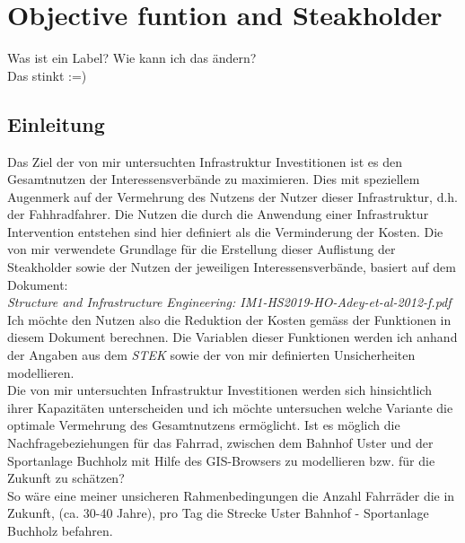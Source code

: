 %
%
%
%

\chapter{Objective funtion and Steakholder}
\label{chap:Function}

Was ist ein Label? \newline
Wie kann ich das ändern? \\ [2ex]
Das stinkt :=)

\section{\textbf{{Einleitung}}}

Das Ziel der von mir untersuchten Infrastruktur Investitionen ist es den Gesamtnutzen der Interessensverbände zu maximieren. \newline Dies mit speziellem Augenmerk auf der Vermehrung des Nutzens der Nutzer dieser Infrastruktur, d.h. der Fahhradfahrer. \newline
Die Nutzen die durch die Anwendung einer Infrastruktur Intervention entstehen sind hier definiert als die Verminderung der Kosten. \newline
Die von mir verwendete Grundlage für die Erstellung dieser Auflistung der Steakholder sowie der Nutzen der jeweiligen Interessensverbände, basiert auf dem Dokument: \\ [2ex]
\noindent\hspace*{10mm}\textit{Structure and Infrastructure Engineering: IM1-HS2019-HO-Adey-et-al-2012-f.pdf} \\ [2ex]
Ich möchte den Nutzen also die Reduktion der Kosten gemäss der Funktionen in diesem Dokument berechnen. 
Die Variablen dieser Funktionen werden ich anhand der Angaben aus dem \textit{STEK} sowie der von mir definierten Unsicherheiten modellieren. \\ [2ex]
Die von mir untersuchten Infrastruktur Investitionen werden sich hinsichtlich ihrer Kapazitäten unterscheiden und ich möchte untersuchen welche Variante die optimale Vermehrung des Gesamtnutzens ermöglicht. \newline
Ist es möglich die Nachfragebeziehungen für das Fahrrad, zwischen dem Bahnhof Uster und der Sportanlage Buchholz mit Hilfe des GIS-Browsers zu modellieren bzw. für die Zukunft zu schätzen? \\ [2ex]
So wäre eine meiner unsicheren Rahmenbedingungen die Anzahl Fahrräder die in Zukunft, \newline (ca. 30-40 Jahre), pro Tag die Strecke Uster Bahnhof - Sportanlage Buchholz befahren.

